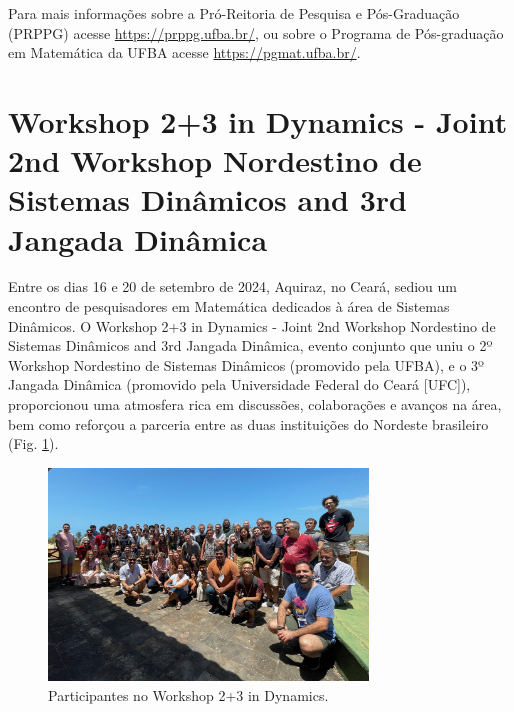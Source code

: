 \documentclass{hipatia}
\begin{document}

Para mais informações sobre a Pró-Reitoria de Pesquisa e Pós-Graduação (PRPPG) acesse
 \href{https://prppg.ufba.br/}{https://prppg.ufba.br/}, ou sobre o Programa de Pós-graduação em Matemática da UFBA acesse \href{https://pgmat.ufba.br/}{https://pgmat.ufba.br/}.
 


\section{Workshop 2+3 in Dynamics - Joint 2nd Workshop Nordestino de Sistemas Dinâmicos and 3rd Jangada Dinâmica}



Entre os dias 16 e 20 de setembro de 2024, Aquiraz, no Ceará, sediou um encontro de pesquisadores em Matemática dedicados à área de Sistemas Dinâmicos. O Workshop 2+3 in Dynamics - Joint 2nd Workshop Nordestino de Sistemas Dinâmicos and 3rd Jangada Dinâmica, evento conjunto que uniu o 2º Workshop Nordestino de Sistemas Dinâmicos (promovido pela UFBA), e o 3º Jangada Dinâmica (promovido pela Universidade Federal do Ceará [UFC]),  proporcionou uma atmosfera rica em discussões, colaborações e avanços na área, bem como reforçou a parceria entre as duas instituições do Nordeste brasileiro (Fig. \ref{workshop2}).

\begin{figure}[htb]
    \centering
    \includegraphics[width=8.5cm]{Workshop2.jpg}
    \caption{Participantes no Workshop 2+3 in Dynamics.}
 \label{workshop2}
\end{figure}
\end{document}
